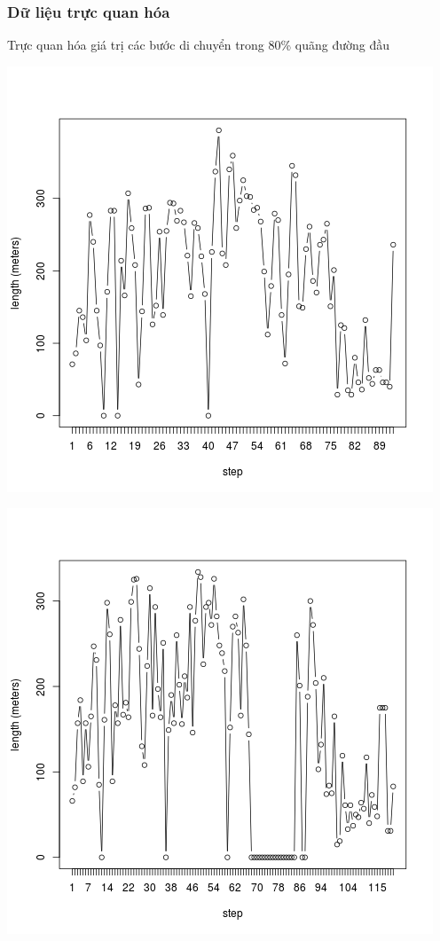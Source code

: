\documentclass[t]{beamer}
\begin{document}

\begin{frame}[t]
\frametitle{Dữ liệu trực quan hóa}Trực quan hóa giá trị các bước di chuyển trong 80\% quãng đường đầu\\
\begin{center}
\begin{minipage}{0.48\linewidth}
\includegraphics[width=\linewidth]{test_80_1}
\end{minipage}%
\hfill
\begin{minipage}{0.49\linewidth}
\includegraphics[width=\linewidth]{test_80_2}
\end{minipage}
\end{center}
\end{frame}
\end{document}
